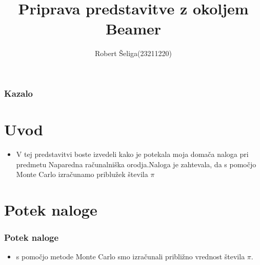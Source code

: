 \documentclass{beamer}
\begin{document}
\title{Priprava predstavitve z okoljem Beamer}
\author[]{Robert Šeliga(23211220)}



\begin{frame}
  \titlepage
\end{frame}

\begin{frame}
  \frametitle{Kazalo}
  \tableofcontents
\end{frame}

\section{Uvod}
\begin{itemize}
    \item V tej predstavitvi boste izvedeli kako je potekala moja domača naloga pri predmetu Naparedna računalniška orodja.Naloga je zahtevala, da s pomočjo Monte Carlo izračunamo priblužek števila $\pi$
\end{itemize}

\section{Potek naloge}
\begin{frame}
  \frametitle{Potek naloge}
  \begin{itemize}
    \item s pomočjo metode Monte Carlo smo izračunali približno vrednost števila $\pi$.
\end{itemize}
\end{frame}
\end{document}
